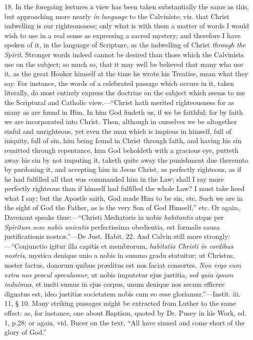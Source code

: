 18. In the foregoing lectures a view has been taken substantially
the same as this, but approaching more nearly \emph{in language} to
the Calvinists; viz. that Christ indwelling is our righteousness; only
what is with them a matter of words I would wish to use in a real
sense as expressing a sacred mystery; and therefore I have spoken of
it, in the language of Scripture, as the indwelling of Christ \emph{through
the Spirit}. Stronger words indeed cannot be desired than those
which the Calvinists use on the subject; so much so, that it may well
be believed that many who use it, as the great Hooker himself at the
time he wrote his Treatise, mean what they say. For instance, the
words of a celebrated passage which occurs in it, taken literally, do
most entirely express the doctrine on the subject which seems to me
the Scriptural and Catholic view.—``Christ hath merited
righteousness for as many as are found in Him. In him God findeth us,
if we be faithful; for by faith we are incorporated into Christ. Then,
although in ourselves we be altogether sinful and unrighteous, yet
even the man which is impious in himself, full of iniquity, full of
sin, him being found in Christ through faith, and having his sin
remitted through repentance, him God beholdeth with a gracious eye,
putteth away his sin by not imputing it, taketh quite away the
punishment due thereunto by pardoning it, and accepting him in Jesus
Christ, as perfectly righteous, as if he had fulfilled all that was
commanded him in the Law; shall I say more perfectly righteous than if
himself had fulfilled the whole Law? I must take heed what I say; but
the Apostle saith, God made Him to be sin, etc. Such we are in the
sight of God the Father, as is the very Son of God Himself,'' etc.
Or again, Davenant speaks thus:—``Christi Mediatoris in nobis \emph{habitantis}
atque per \emph{Spiritum sese nobis unientis} perfectissima obedientia,
est formalis causa justificationis nostræ.''—De Just.
Habit. 22. And Calvin still more strongly:—``Conjunctio igitur
illa capitis et membrorum, \emph{habitatio Christi in cordibus nostris},
mystica denique unio a nobis in summo gradu statuitur; ut Christus,
noster factus, donorum quibus præditus est nos faciat consortes. \emph{Non
ergo eum extra nos procul speculamur}, ut nobis imputetur ejus
justitia, \emph{sed quia ipsum induimus}, et insiti sumus in ejus
corpus, unum denique nos secum efficere dignatus est, ideo justitiæ
societatem nobis cum eo esse gloriamur.''—Instit. iii. 11, §
10. Many striking passages might be extracted from Luther to the same
effect: as, for instance, one about Baptism, quoted by Dr. Pusey in
his Work, ed. 1, p.28; or again, vid. Bucer on the text, ``All
have sinned and come short of the glory of God.''

